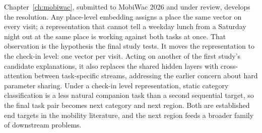 Chapter~\ref{ch:mobiwac}, submitted to MobiWac 2026 and under review, develops the
resolution. Any place-level embedding assigns a place the same vector on every visit; a
representation that cannot tell a weekday lunch from a Saturday night out at the same
place is working against both tasks at once. That observation is the hypothesis the
final study tests. It moves the representation to the check-in level: one vector per
visit. Acting on another of the first study's candidate explanations, it also replaces
the shared hidden layers with cross-attention between task-specific streams, addressing
the earlier concern about hard parameter sharing. Under a check-in level representation, static
category classification is a less natural companion task than a second sequential target,
so the final task pair becomes next category and next region. Both are established end
targets in the mobility literature, and the next region feeds a broader family of
downstream problems.
